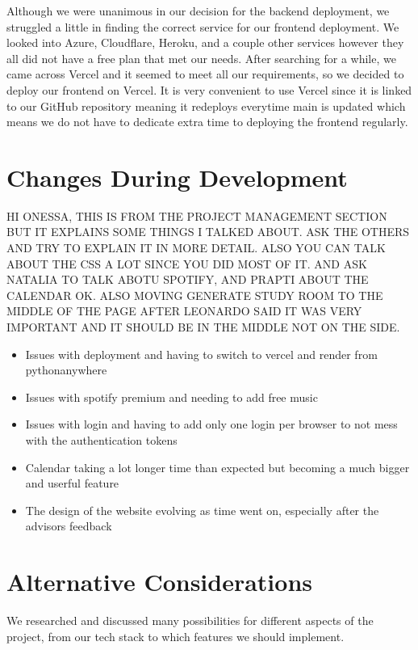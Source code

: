 Although we were unanimous in our decision for the backend deployment, we struggled a little in finding the correct service for our frontend deployment. We looked into Azure, Cloudflare, Heroku, and a couple other services however they all did not have a free plan that met our needs. After searching for a while, we came across Vercel and it seemed to meet all our requirements, so we decided to deploy our frontend on Vercel. It is very convenient to use Vercel since it is linked to our GitHub repository meaning it redeploys everytime main is updated which means we do not have to dedicate extra time to deploying the frontend regularly.



\section{Changes During Development}
\label{sect:changes-during-development}

HI ONESSA, THIS IS FROM THE PROJECT MANAGEMENT SECTION BUT IT EXPLAINS SOME THINGS I TALKED ABOUT. ASK THE OTHERS AND TRY TO EXPLAIN IT IN MORE DETAIL. ALSO YOU CAN TALK ABOUT THE CSS A LOT SINCE YOU DID MOST OF IT. AND ASK NATALIA TO TALK ABOTU SPOTIFY, AND PRAPTI ABOUT THE CALENDAR OK. ALSO MOVING GENERATE STUDY ROOM TO THE MIDDLE OF THE PAGE AFTER LEONARDO SAID IT WAS VERY IMPORTANT AND IT SHOULD BE IN THE MIDDLE NOT ON THE SIDE.
\begin{itemize}
    \item Issues with deployment and having to switch to vercel and render from pythonanywhere
    \item Issues with spotify premium and needing to add free music
    \item Issues with login and having to add only one login per browser to not mess with the authentication tokens
    \item Calendar taking a lot longer time than expected but becoming a much bigger and userful feature
    \item The design of the website evolving as time went on, especially after the advisors feedback
\end{itemize}

\section{Alternative Considerations}
\label{sect:alternative-considerations}
We researched and discussed many possibilities for different aspects of the project, from our tech stack to which features we should implement.

